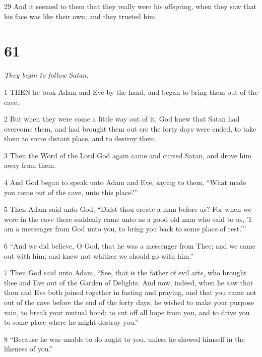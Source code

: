 \par 29 And it seemed to them that they really were his offspring, when they saw that his face was like their own; and they trusted him.

\chapter{61}

\par \textit{They begin to follow Satan.}

\par 1 THEN he took Adam and Eve by the hand, and began to bring them out of the cave.

\par 2 But when they were come a little way out of it, God knew that Satan had overcome them, and had brought them out ere the forty days were ended, to take them to some distant place, and to destroy them.

\par 3 Then the Word of the Lord God again came and cursed Satan, and drove him away from them.

\par 4 And God began to speak unto Adam and Eve, saying to them, “What made you come out of the cave, unto this place?”

\par 5 Then Adam said unto God, “Didst thou create a man before us? For when we were in the cave there suddenly came unto us a good old man who said to us, 'I am a messenger from God unto you, to bring you back to some place of rest.'”

\par 6 “And we did believe, O God, that he was a messenger from Thee; and we came out with him; and knew not whither we should go with him.”

\par 7 Then God said unto Adam, “See, that is the father of evil arts, who brought thee and Eve out of the Garden of Delights. And now, indeed, when he saw that thou and Eve both joined together in fasting and praying, and that you came not out of the cave before the end of the forty days, he wished to make your purpose vain, to break your mutual bond; to cut off all hope from you, and to drive you to some place where he might destroy you.”

\par 8 “Because he was unable to do aught to you, unless he showed himself in the likeness of you.”

